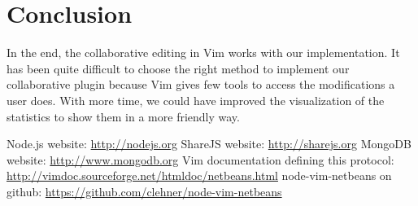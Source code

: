 \documentclass{llncs}
\begin{document}
\section{Conclusion}\label{sec:Conclusion}

In the end, the collaborative editing in Vim works with our implementation.
It has been quite difficult to choose the right method to implement our collaborative plugin
because Vim gives few tools to access the modifications a user does. With more time,
we could have improved the visualization of the statistics to show them in a more friendly way.

\begin{thebibliography}{1}

Node.js website: \url{http://nodejs.org}
ShareJS website: \url{http://sharejs.org}
MongoDB website: \url{http://www.mongodb.org}
Vim documentation defining this protocol: \url{http://vimdoc.sourceforge.net/htmldoc/netbeans.html}
node-vim-netbeans on github: \url{https://github.com/clehner/node-vim-netbeans}

\end{thebibliography}
\end{document}
